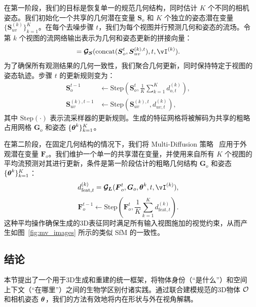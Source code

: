 \documentclass[../../book-main_zh.tex]{subfiles}
\begin{document}
在第一阶段，我们的目标是恢复单一的规范几何结构，同时估计 $K$ 个不同的相机姿态。我们初始化一个共享的几何潜在变量 $\boldsymbol{S}_{o}$ 和 $K$ 个独立的姿态潜在变量 $\{ \boldsymbol{S}_{uv}^{(k)} \}_{k=1}^K$。在每个去噪步骤 $t$，我们为每个视图并行预测几何和姿态的流场。令第 $k$ 个视图的流网络输出表示为几何和姿态更新的拼接向量：
\begin{equation}
    [d_{o, t}^{(k)}, d_{uv, t}^{(k)}] = \sflow(\text{concat}(\boldsymbol{S}_{o}^t, \boldsymbol{S}_{uv}^{(k), t}), t, \image^{(k)}).
\end{equation}
为了确保所有观测结果的几何一致性，我们聚合几何更新，同时保持特定于视图的姿态轨迹。步骤 $t$ 的更新规则变为：
\begin{equation}
\begin{aligned}
    \boldsymbol{S}_{o}^{t-1} &\leftarrow \text{Step}\left(\boldsymbol{S}_{o}^{t}, \frac{1}{K} \sum_{k=1}^K d_{o, t}^{(k)}\right), \\
    \boldsymbol{S}_{uv}^{(k), t-1} &\leftarrow \text{Step}\left(\boldsymbol{S}_{uv}^{(k), t}, d_{uv, t}^{(k)}\right),
\end{aligned}
\end{equation}
其中 $\text{Step}(\cdot)$ 表示流采样器的更新规则。生成的特征网格将被解码为共享的粗略占用网格 $\boldsymbol{G}_o$ 和姿态 $\{\boldsymbol{\theta}^{k}\}_{k=1}^{K}$。

在第二阶段，在固定几何结构的情况下，我们将 Multi-Diffusion 策略~\citep{bar2023multidiffusion} 应用于外观潜在变量 $\boldsymbol{F}_{o}$。我们维护一个单一的共享潜在变量，并使用来自所有 $K$ 个视图的平均流预测对其进行更新，条件是第一阶段估计的粗略几何结构 $\boldsymbol{G}_o$ 和姿态 $\{\boldsymbol{\theta}^{k}\}_{k=1}^{K}$：
\begin{equation}
    d_{\text{feat}, t}^{(k)} = \lflow(\boldsymbol{F}_{o}^t, \boldsymbol{G}_o, \pose^{k}, t, \image^{(k)}),
\end{equation}
\begin{equation}
    \boldsymbol{F}_{o}^{t-1} \leftarrow \text{Step}\left(\boldsymbol{F}_{o}^{t}, \frac{1}{K} \sum_{k=1}^K d_{\text{feat}, t}^{(k)}\right).
\end{equation}
这种平均操作确保生成的3D表征同时满足所有输入视图施加的视觉约束，从而产生如图~\ref{fig:mv_images} 所示的类似 SfM 的一致性。


\subsection{结论}
本节提出了一个用于3D生成和重建的统一框架，将物体身份（“是什么”）和空间上下文（“在哪里”）之间的生物学区别付诸实践。通过联合建模规范的3D物体 $\mathcal{O}$ 和相机姿态 $\boldsymbol{\theta}$，我们的方法有效地将内在形状与外在视角解耦。
\end{document}
